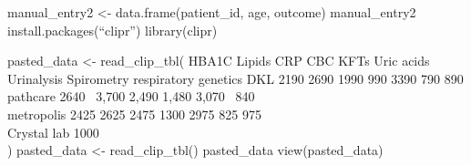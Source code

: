 \documentclass[
]{article}
\begin{document}
manual\_entry2 \textless- data.frame(patient\_id, age, outcome)
manual\_entry2 install.packages(``clipr'') library(clipr)

pasted\_data \textless- read\_clip\_tbl( HBA1C Lipids CRP CBC KFTs Uric
acids Urinalysis Spirometry respiratory genetics DKL 2190 2690 1990 990
3390 790 890\\
pathcare 2640 ~3,700 2,490 1,480 3,070 ~840\\
metropolis 2425 2625 2475 1300 2975 825 975\\
Crystal lab 1000\\
) pasted\_data \textless- read\_clip\_tbl() pasted\_data
view(pasted\_data)
\end{document}

